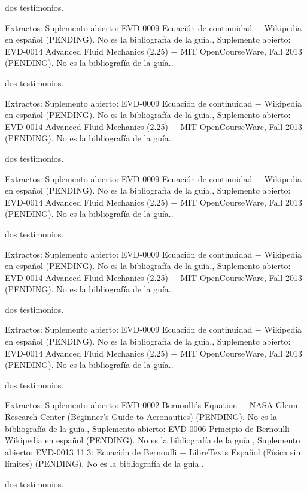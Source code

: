 \documentclass{book}
\begin{document}
\noindent dos testimonios.

\noindent Extractos: Suplemento abierto: EVD-0009 Ecuación de continuidad \(-\) Wikipedia en español (PENDING). No es la bibliografía de la guía., Suplemento abierto: EVD-0014 Advanced Fluid Mechanics (2.25) \(-\) MIT OpenCourseWare, Fall 2013 (PENDING). No es la bibliografía de la guía..

\noindent dos testimonios.

\noindent Extractos: Suplemento abierto: EVD-0009 Ecuación de continuidad \(-\) Wikipedia en español (PENDING). No es la bibliografía de la guía., Suplemento abierto: EVD-0014 Advanced Fluid Mechanics (2.25) \(-\) MIT OpenCourseWare, Fall 2013 (PENDING). No es la bibliografía de la guía..

\noindent dos testimonios.

\noindent Extractos: Suplemento abierto: EVD-0009 Ecuación de continuidad \(-\) Wikipedia en español (PENDING). No es la bibliografía de la guía., Suplemento abierto: EVD-0014 Advanced Fluid Mechanics (2.25) \(-\) MIT OpenCourseWare, Fall 2013 (PENDING). No es la bibliografía de la guía..

\noindent dos testimonios.

\noindent Extractos: Suplemento abierto: EVD-0009 Ecuación de continuidad \(-\) Wikipedia en español (PENDING). No es la bibliografía de la guía., Suplemento abierto: EVD-0014 Advanced Fluid Mechanics (2.25) \(-\) MIT OpenCourseWare, Fall 2013 (PENDING). No es la bibliografía de la guía..

\noindent dos testimonios.

\noindent Extractos: Suplemento abierto: EVD-0009 Ecuación de continuidad \(-\) Wikipedia en español (PENDING). No es la bibliografía de la guía., Suplemento abierto: EVD-0014 Advanced Fluid Mechanics (2.25) \(-\) MIT OpenCourseWare, Fall 2013 (PENDING). No es la bibliografía de la guía..

\noindent dos testimonios.

\noindent Extractos: Suplemento abierto: EVD-0002 Bernoulli's Equation \(-\) NASA Glenn Research Center (Beginner's Guide to Aeronautics) (PENDING). No es la bibliografía de la guía., Suplemento abierto: EVD-0006 Principio de Bernoulli \(-\) Wikipedia en español (PENDING). No es la bibliografía de la guía., Suplemento abierto: EVD-0013 11.3: Ecuación de Bernoulli \(-\) LibreTexts Español (Física sin límites) (PENDING). No es la bibliografía de la guía..

\noindent dos testimonios.
\end{document}
